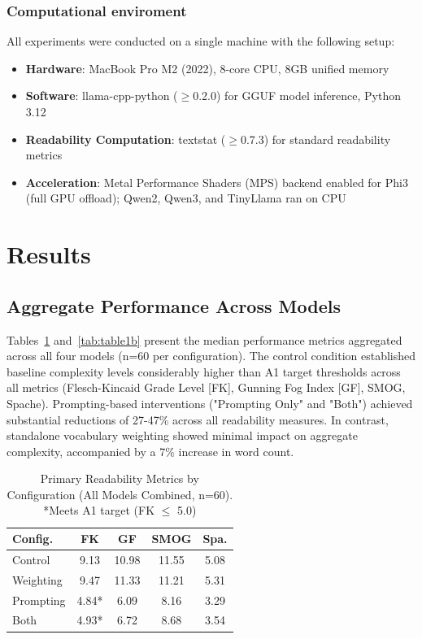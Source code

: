 \documentclass[10pt, a4paper]{article}
\begin{document}
\subsubsection{Computational enviroment}
All experiments were conducted on a single machine with the following setup:

\begin{itemize}
    \item \textbf{Hardware}: MacBook Pro M2 (2022), 8-core CPU, 8GB unified memory
    \item \textbf{Software}: llama-cpp-python ($\geq$0.2.0) for GGUF model inference, Python 3.12
    \item \textbf{Readability Computation}: textstat ($\geq$0.7.3) for standard readability metrics
    \item \textbf{Acceleration}: Metal Performance Shaders (MPS) backend enabled for Phi3 (full GPU offload); Qwen2, Qwen3, and TinyLlama ran on CPU
\end{itemize}

\section{Results}

\subsection{Aggregate Performance Across Models}

Tables~\ref{tab:table1a} and~\ref{tab:table1b} present the median performance metrics aggregated across all four models (n=60 per configuration). The control condition established baseline complexity levels considerably higher than A1 target thresholds across all metrics (Flesch-Kincaid Grade Level [FK], Gunning Fog Index [GF], SMOG, Spache). Prompting-based interventions ("Prompting Only" and "Both") achieved substantial reductions of 27-47\% across all readability measures. In contrast, standalone vocabulary weighting showed minimal impact on aggregate complexity, accompanied by a 7\% increase in word count.

\begin{table}[!ht]
\begin{center}
\begin{tabular}{lcccc}
\hline
\textbf{Config.} & \textbf{FK} & \textbf{GF} & \textbf{SMOG} & \textbf{Spa.} \\
\hline
Control   & 9.13  & 10.98 & 11.55 & 5.08 \\
Weighting & 9.47  & 11.33 & 11.21 & 5.31 \\
Prompting & 4.84* & 6.09  & 8.16  & 3.29 \\
Both      & 4.93* & 6.72  & 8.68  & 3.54 \\
\hline
\end{tabular}
\caption{Primary Readability Metrics by Configuration (All Models Combined, n=60). *Meets A1 target (FK $\leq$ 5.0)}
\label{tab:table1a}
\end{center}
\end{table}
\end{document}
